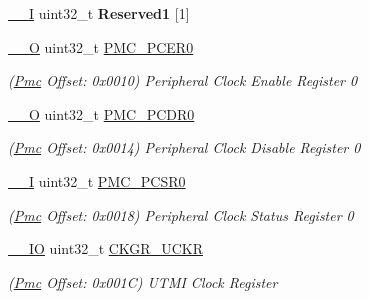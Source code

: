 \begin{DoxyCompactItemize}
\mbox{\label{structPmc_abc7ccfe763f70ea3652513f4ef5d8b80}} 
\mbox{\hyperlink{core__cm7_8h_af63697ed9952cc71e1225efe205f6cd3}{\+\_\+\+\_\+I}} uint32\+\_\+t {\bfseries Reserved1} \mbox{[}1\mbox{]}
\item 
\mbox{\label{structPmc_a3d1ec22830efb010d44b7e818a9277ec}} 
\mbox{\hyperlink{core__cm7_8h_a7e25d9380f9ef903923964322e71f2f6}{\+\_\+\+\_\+O}} uint32\+\_\+t \mbox{\hyperlink{structPmc_a3d1ec22830efb010d44b7e818a9277ec}{P\+M\+C\+\_\+\+P\+C\+E\+R0}}
\begin{DoxyCompactList}\small\item\em (\mbox{\hyperlink{structPmc}{Pmc}} Offset\+: 0x0010) Peripheral Clock Enable Register 0 \end{DoxyCompactList}\item 
\mbox{\label{structPmc_a4e2fcec6260274f1035e898f99e95f17}} 
\mbox{\hyperlink{core__cm7_8h_a7e25d9380f9ef903923964322e71f2f6}{\+\_\+\+\_\+O}} uint32\+\_\+t \mbox{\hyperlink{structPmc_a4e2fcec6260274f1035e898f99e95f17}{P\+M\+C\+\_\+\+P\+C\+D\+R0}}
\begin{DoxyCompactList}\small\item\em (\mbox{\hyperlink{structPmc}{Pmc}} Offset\+: 0x0014) Peripheral Clock Disable Register 0 \end{DoxyCompactList}\item 
\mbox{\label{structPmc_a22a88879f89c27a749b6302faa1cdaac}} 
\mbox{\hyperlink{core__cm7_8h_af63697ed9952cc71e1225efe205f6cd3}{\+\_\+\+\_\+I}} uint32\+\_\+t \mbox{\hyperlink{structPmc_a22a88879f89c27a749b6302faa1cdaac}{P\+M\+C\+\_\+\+P\+C\+S\+R0}}
\begin{DoxyCompactList}\small\item\em (\mbox{\hyperlink{structPmc}{Pmc}} Offset\+: 0x0018) Peripheral Clock Status Register 0 \end{DoxyCompactList}\item 
\mbox{\label{structPmc_a04f90fe93f8780d99649be6586e3524a}} 
\mbox{\hyperlink{core__cm7_8h_aec43007d9998a0a0e01faede4133d6be}{\+\_\+\+\_\+\+IO}} uint32\+\_\+t \mbox{\hyperlink{structPmc_a04f90fe93f8780d99649be6586e3524a}{C\+K\+G\+R\+\_\+\+U\+C\+KR}}
\begin{DoxyCompactList}\small\item\em (\mbox{\hyperlink{structPmc}{Pmc}} Offset\+: 0x001C) U\+T\+MI Clock Register \end{DoxyCompactList}\item 

\end{DoxyCompactItemize}
